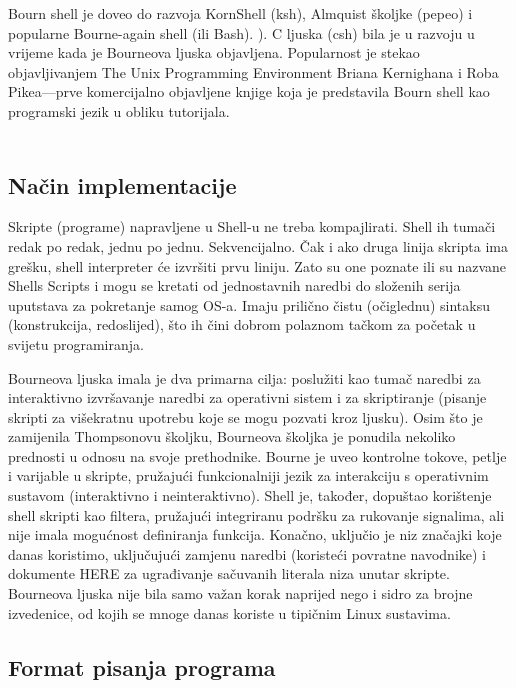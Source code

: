 \documentclass[11pt]{book}
\begin{document}
Bourn shell je doveo do razvoja KornShell (ksh), Almquist školjke (pepeo) i popularne Bourne-again shell (ili Bash). ). C ljuska (csh) bila je u razvoju u vrijeme kada je Bourneova ljuska objavljena.
Popularnost je stekao objavljivanjem The Unix Programming Environment Briana Kernighana i Roba Pikea—prve komercijalno objavljene knjige koja je predstavila Bourn shell kao programski jezik u obliku tutorijala.\\\\


\subsection {Način implementacije}

Skripte (programe) napravljene u Shell-u ne treba kompajlirati. Shell ih tumači redak po redak, jednu po jednu. Sekvencijalno. Čak i ako druga linija skripta ima grešku, shell interpreter će izvršiti prvu liniju.
Zato su one poznate ili su nazvane Shells Scripts i mogu se kretati od jednostavnih naredbi do složenih serija uputstava za pokretanje samog OS-a. Imaju prilično čistu (očiglednu) sintaksu (konstrukcija, redoslijed), što ih čini dobrom polaznom tačkom za početak u svijetu programiranja.

Bourneova ljuska imala je dva primarna cilja: poslužiti kao tumač naredbi za interaktivno izvršavanje naredbi za operativni sistem i za skriptiranje (pisanje skripti za višekratnu upotrebu koje se mogu pozvati kroz ljusku). Osim što je zamijenila Thompsonovu školjku, Bourneova školjka je ponudila nekoliko prednosti u odnosu na svoje prethodnike. Bourne je uveo kontrolne tokove, petlje i varijable u skripte, pružajući funkcionalniji jezik za interakciju s operativnim sustavom (interaktivno i neinteraktivno). Shell je, također, dopuštao korištenje shell skripti kao filtera, pružajući integriranu podršku za rukovanje signalima, ali nije imala mogućnost definiranja funkcija. Konačno, uključio je niz značajki koje danas koristimo, uključujući zamjenu naredbi (koristeći povratne navodnike) i dokumente HERE za ugrađivanje sačuvanih literala niza unutar skripte. Bourneova ljuska nije bila samo važan korak naprijed nego i sidro za brojne izvedenice, od kojih se mnoge danas koriste u tipičnim Linux sustavima. 


\subsection {Format pisanja programa}
\end{document}
